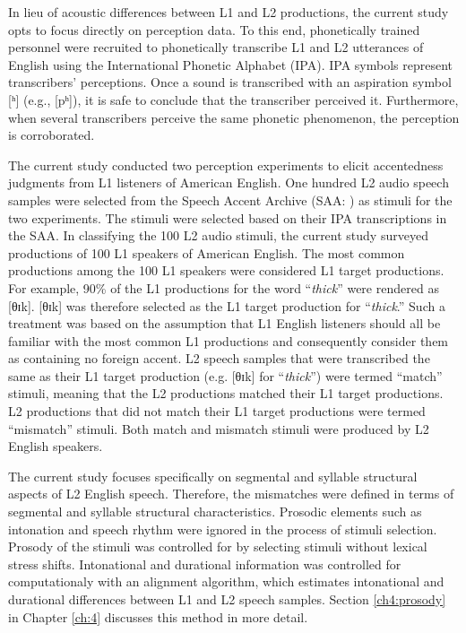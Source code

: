 In lieu of acoustic differences between L1 and L2 productions, the current study opts to focus directly on perception data. To this end, phonetically trained personnel were recruited to phonetically transcribe L1 and L2 utterances of English using the International Phonetic Alphabet (IPA). IPA symbols represent transcribers’ perceptions. Once a sound is transcribed with an aspiration symbol [ʰ] (e.g., [pʰ]), it is safe to conclude that the transcriber perceived it.  Furthermore, when several transcribers perceive the same phonetic phenomenon, the perception is corroborated. 

The current study conducted two perception experiments to elicit accentedness judgments from L1 listeners of American English. One hundred L2 audio speech samples were selected from the Speech Accent Archive (SAA: \citealp{Weinberger_saa_2019}) as stimuli for the two experiments. The stimuli were selected based on their IPA transcriptions in the SAA. In classifying the 100 L2 audio stimuli, the current study surveyed productions of 100 L1 speakers of American English. The most common productions among the 100 L1 speakers were considered L1 target productions. For example, 90\% of the L1 productions for the word “\textit{thick}” were rendered as [θɪk]. [θɪk] was therefore selected as the L1 target production for “\textit{thick}.” Such a treatment was based on the assumption that L1 English listeners should all be familiar with the most common L1 productions and consequently consider them as containing no foreign accent. L2 speech samples that were transcribed the same as their L1 target production (e.g. [θɪk] for “\textit{thick}”) were termed “match” stimuli, meaning that the L2 productions matched their L1 target productions. L2 productions that did not match their L1 target productions were termed “mismatch” stimuli. Both match and mismatch stimuli were produced by L2 English speakers. 

The current study focuses specifically on segmental and syllable structural aspects of L2 English speech. Therefore, the mismatches were defined in terms of segmental and syllable structural characteristics. Prosodic elements such as intonation and speech rhythm were ignored in the process of stimuli selection. Prosody of the stimuli was controlled for by selecting stimuli without lexical stress shifts. Intonational and durational information was controlled for computationaly with an alignment algorithm, which estimates intonational and durational differences between L1 and L2 speech samples. Section \ref{ch4:prosody} in Chapter \ref{ch:4} discusses this method in more detail.

